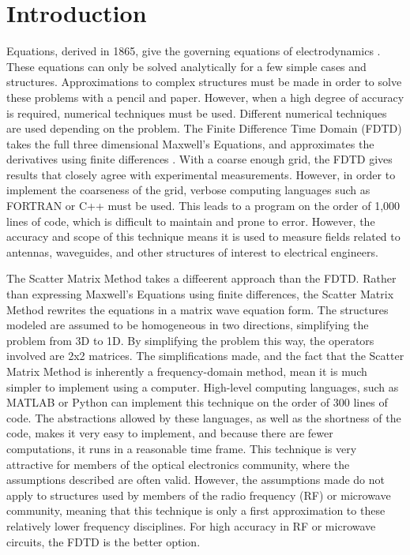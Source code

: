 \section{Introduction} \label{sec: intro}

 Equations, derived in 1865, give the governing 
equations of electrodynamics \cite{Maxwell}.  These equations can only be solved
analytically for a few simple cases and structures.  Approximations to complex 
structures must be made in order to solve these problems with a pencil and 
paper.  However, when a high degree of accuracy is required, numerical techniques 
must be used.  Different numerical techniques are used depending on the problem.
The Finite Difference Time Domain (FDTD) takes the full three dimensional 
Maxwell’s Equations, and approximates the derivatives using finite differences 
\cite{Yee}.  With a coarse enough grid, the FDTD gives results that closely 
agree with experimental measurements.  However, in order to implement the 
coarseness of the grid, verbose computing languages such as FORTRAN or C++ must
be used.  This leads to a program on the order of 1,000 lines of code, which is 
difficult to maintain and prone to error.  However, the accuracy and scope of 
this technique means it is used to measure fields related to antennas, waveguides,
and other structures of interest to electrical engineers. 

The Scatter Matrix Method takes a diffeerent approach than the FDTD.  Rather than
expressing Maxwell’s Equations using finite differences, the Scatter Matrix 
Method rewrites the equations in a matrix wave equation form.  The structures 
modeled   are assumed to be homogeneous in two directions, simplifying the 
problem from 3D to 1D.  By simplifying the problem this way, the operators 
involved are 2x2 matrices.  The simplifications made, 
and the fact that the Scatter Matrix Method is inherently a frequency-domain 
method, mean it is much simpler to implement using a computer.  High-level 
computing languages, such as MATLAB or Python can implement this technique on 
the order of 300 lines of code.  The abstractions allowed by these languages, as
well as the shortness of the code, makes it very easy to implement, and because 
there are fewer computations, it runs in a reasonable time frame.  This technique
is very attractive for members of the optical electronics community, where the 
assumptions described are often valid.  However, the assumptions made do not apply 
to structures used by members of the radio frequency (RF) or microwave community, 
meaning that this technique is only a first approximation to these relatively 
lower frequency disciplines.  For high accuracy in RF or microwave circuits, 
the FDTD is the better option. 


